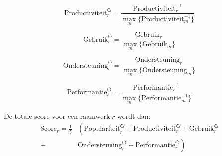 \begin{equation}
  \text{Productiviteit}_r^{\pentagon} = \frac{\text{Productiviteit}_r^{-1}}{\underset{m}{\max}\{\text{Productiviteit}_m^{-1}\}}
  \label{eq:rel-productiviteit}
\end{equation}

\begin{equation}
  \text{Gebruik}_r^{\pentagon} = \frac{\text{Gebruik}_r}{\underset{m}{\max}\{\text{Gebruik}_m\}}
  \label{eq:rel-gebruik}
\end{equation}

\begin{equation}
  \text{Ondersteuning}_r^{\pentagon} = \frac{\text{Ondersteuning}_r}{\underset{m}{\max}\{\text{Ondersteuning}_m\}}
  \label{eq:rel-ondersteuning}
\end{equation}

\begin{equation}
  \text{Performantie}_r^{\pentagon}= \frac{\text{Performantie}_r^{-1}}{\underset{m}{\max}\{\text{Performantie}_m^{-1}\}}
  \label{eq:rel-performantie}
\end{equation}

De totale score voor een raamwerk $r$ wordt dan:
\begin{equation}
\begin{split}
  \text{Score}_r = \frac{1}{5} &\left( \text{Populariteit}_r^{\pentagon}
  + \text{Productiviteit}_r^{\pentagon} 
  + \text{Gebruik}_r^{\pentagon} \right. \\
  + &\left. \text{Ondersteuning}_r^{\pentagon}
  + \text{Performantie}_r^{\pentagon} \right)
  \end{split}
  \label{eq:rel-totaal}
\end{equation}
